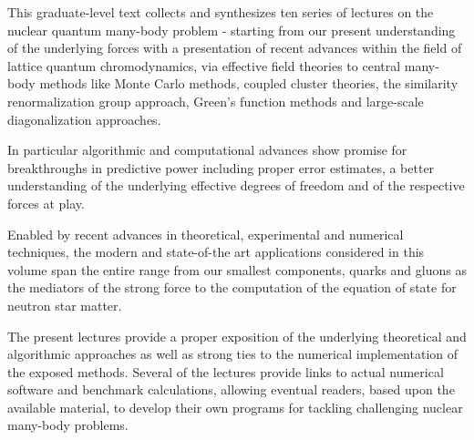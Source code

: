 \preface
This graduate-level text collects and synthesizes ten series of
lectures on the nuclear quantum many-body problem - starting from our
present understanding of the underlying forces with a presentation of
recent advances within the field of lattice quantum chromodynamics,
via effective field theories to central many-body methods like Monte
Carlo methods, coupled cluster theories, the similarity renormalization group approach, Green's function methods 
and large-scale
diagonalization approaches.

In particular algorithmic and computational advances show promise for
breakthroughs in predictive power including proper error estimates, a
better understanding of the underlying effective degrees of freedom
and of the respective forces at play.

Enabled by recent advances in theoretical, experimental and numerical
techniques, the modern and state-of-the art applications considered in
this volume span the entire range from our smallest components, quarks
and gluons as the mediators of the strong force to the computation of
the equation of state for neutron star matter.

 

The present lectures provide a proper exposition of the underlying
theoretical and algorithmic approaches as well as strong ties to the
numerical implementation of the exposed methods. Several of the
lectures provide links to actual numerical software and benchmark
calculations, allowing eventual readers, based upon the available
material, to develop their own programs for tackling challenging
nuclear many-body problems.

